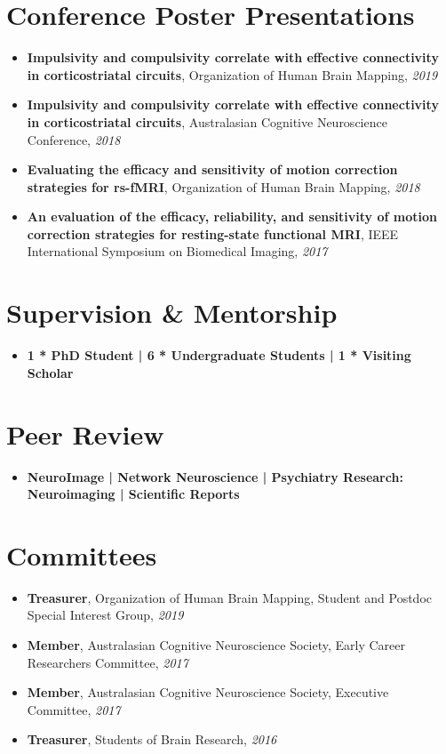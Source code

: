\documentclass[letterpaper,10pt]{article}
\newcommand{\resumeSubHeadingListStart}{\begin{itemize}[leftmargin=*]}
\newcommand{\resumeSubHeadingListEnd}{\end{itemize}}
\begin{document}
\section{Conference Poster Presentations}
  \resumeSubHeadingListStart
    \item[] \textbf{Impulsivity and compulsivity correlate with effective connectivity in corticostriatal circuits}, Organization of Human Brain Mapping, \textit{2019}
    \item[] \textbf{Impulsivity and compulsivity correlate with effective connectivity in corticostriatal circuits}, Australasian Cognitive Neuroscience Conference, \textit{2018}
    \item[] \textbf{Evaluating the efficacy and sensitivity of motion correction strategies for rs-fMRI}, Organization of Human Brain Mapping, \textit{2018}
    \item[] \textbf{An evaluation of the efficacy, reliability, and sensitivity of motion correction strategies for resting-state functional MRI}, IEEE International Symposium on Biomedical Imaging, \textit{2017}
  \resumeSubHeadingListEnd

\section{Supervision \& Mentorship}
  \resumeSubHeadingListStart
    \item[] \textbf{1 * PhD Student | 6 * Undergraduate Students | 1 * Visiting Scholar}
  \resumeSubHeadingListEnd

\section{Peer Review}
  \resumeSubHeadingListStart
    \item[] \textbf{NeuroImage | Network Neuroscience | Psychiatry Research: Neuroimaging | Scientific Reports}
  \resumeSubHeadingListEnd

\section{Committees}
  \resumeSubHeadingListStart
    \item[] \textbf{Treasurer}, Organization of Human Brain Mapping, Student and Postdoc Special Interest Group, \textit{2019}
    \item[] \textbf{Member}, Australasian Cognitive Neuroscience Society, Early Career Researchers Committee, \textit{2017}
    \item[] \textbf{Member}, Australasian Cognitive Neuroscience Society, Executive Committee, \textit{2017}
    \item[] \textbf{Treasurer}, Students of Brain Research, \textit{2016}
  \resumeSubHeadingListEnd
\end{document}
